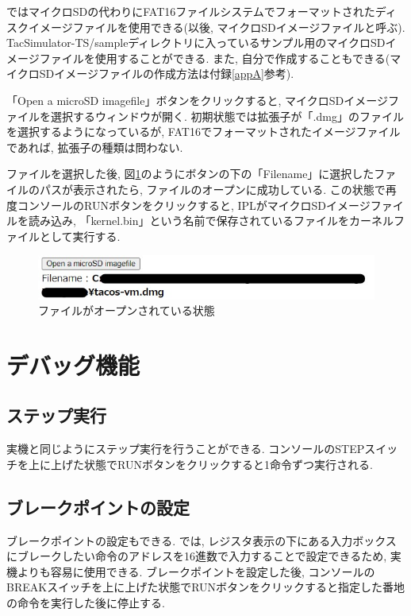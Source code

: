 \tacsim ではマイクロSDの代わりにFAT16ファイルシステムでフォーマットされたディスクイメージファイルを使用できる(以後, マイクロSDイメージファイルと呼ぶ). TacSimulator-TS/sampleディレクトリに入っているサンプル用のマイクロSDイメージファイルを使用することができる. また, 自分で作成することもできる(マイクロSDイメージファイルの作成方法は付録\ref{appA}参考).

「Open a microSD imagefile」ボタンをクリックすると, マイクロSDイメージファイルを選択するウィンドウが開く. 初期状態では拡張子が「.dmg」のファイルを選択するようになっているが, FAT16でフォーマットされたイメージファイルであれば, 拡張子の種類は問わない.

ファイルを選択した後, 図\ref{fig:ch3-filepath}のようにボタンの下の「Filename」に選択したファイルのパスが表示されたら, ファイルのオープンに成功している. この状態で再度コンソールのRUNボタンをクリックすると, IPLがマイクロSDイメージファイルを読み込み, 「kernel.bin」という名前で保存されているファイルをカーネルファイルとして実行する.

\begin{figure}[H]
    \centering
    \includegraphics[width=12cm]{"figs/chapter3-filepath.jpg"}
    \caption{ファイルがオープンされている状態} \label{fig:ch3-filepath}
\end{figure}


\section{デバッグ機能}

\subsection{ステップ実行}
実機と同じようにステップ実行を行うことができる. コンソールのSTEPスイッチを上に上げた状態でRUNボタンをクリックすると1命令ずつ実行される.

\subsection{ブレークポイントの設定}
ブレークポイントの設定もできる. \tacsim では, レジスタ表示の下にある入力ボックスにブレークしたい命令のアドレスを16進数で入力することで設定できるため, 実機よりも容易に使用できる.
ブレークポイントを設定した後, コンソールのBREAKスイッチを上に上げた状態でRUNボタンをクリックすると指定した番地の命令を実行した後に停止する.

